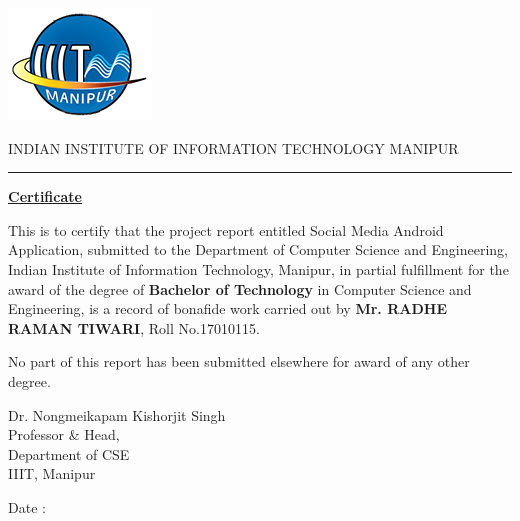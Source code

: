 

\noindent
\begin{minipage}{0.15\textwidth}
	\includegraphics[scale=0.60]{iiitm-logo.png} 
\end{minipage}%
\hfill%
\begin{minipage}{1.0\textwidth}
\begin{center}

\iiitmfont INDIAN INSTITUTE OF INFORMATION TECHNOLOGY MANIPUR
\end{center}
\end{minipage}
\bigskip 
\noindent\rule{15cm}{0.8pt}

\begin{center}
	\textbf{\underline{ Certificate }}
\end{center}%
\begin{onehalfspace}
This is to certify that the project report entitled Social Media Android Application, submitted to the Department of Computer Science and Engineering, Indian Institute of Information Technology, Manipur, in partial fulfillment for the award of the degree of\textbf{ Bachelor of Technology} in Computer Science and Engineering, is a record of bonafide work carried out by \textbf{Mr. RADHE RAMAN TIWARI}, Roll No.17010115.

\noindent 
No part of this report has been submitted elsewhere for award of any other degree.



\vspace{1.5cm}

\begin{center}
\tab
Dr. Nongmeikapam Kishorjit Singh\\
\tab
Professor \& Head,\\
\tab 
Department of CSE\\
\tab
IIIT, Manipur\\


\end{center}
Date :
\end{onehalfspace}

